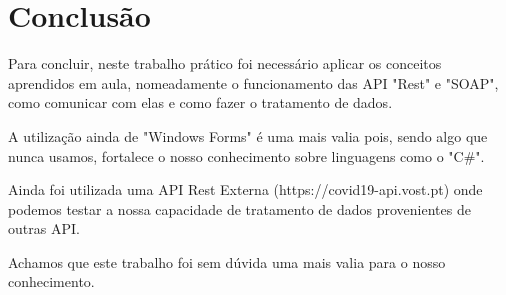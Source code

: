 \chapter{Conclusão}

Para concluir, neste trabalho prático foi necessário aplicar os conceitos aprendidos em aula, nomeadamente
o funcionamento das API "Rest" e "SOAP", como comunicar com elas e como fazer o tratamento de dados.

A utilização ainda de "Windows Forms" é uma mais valia pois, sendo algo que nunca usamos, fortalece o nosso conhecimento sobre linguagens como o "C\#".

Ainda foi utilizada uma API Rest Externa (https://covid19-api.vost.pt) onde podemos testar a nossa capacidade de tratamento de dados provenientes de outras API.

Achamos que este trabalho foi sem dúvida uma mais valia para o nosso conhecimento.